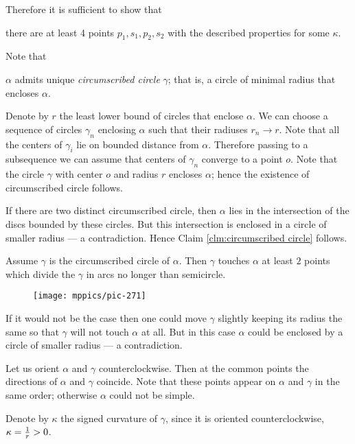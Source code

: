 Therefore it is sufficient to show that

\begin{clm}{}\label{clm-key}
there are at least 4 points $p_1,s_1,p_2,s_2$ with the described properties for some $\kappa$.
\end{clm}


Note that
\begin{clm}{}\label{clm:circumscribed circle}
$\alpha$
admits unique \emph{circumscribed circle} $\gamma$; that is, a circle of minimal radius that encloses $\alpha$.
\end{clm}

Denote by $r$ the least lower bound of circles that enclose $\alpha$.
We can choose a sequence of circles $\gamma_n$ enclosing $\alpha$ such that their radiuses $r_n\to r$.
Note that all the centers of $\gamma_i$ lie on bounded distance from $\alpha$.
Therefore passing to a subsequence we can assume that centers of $\gamma_n$ converge to a point $o$.
Note that the circle $\gamma$ with center $o$ and radius $r$ encloses $\alpha$;
hence the existence of circumscribed circle follows.

If there are two distinct circumscribed circle, then $\alpha$ lies in the intersection of the discs bounded by these circles.
But this intersection is enclosed in a circle of smaller radius --- a contradiction.
Hence Claim \ref{clm:circumscribed circle} follows.


\begin{clm}{}
Assume $\gamma$ is the circumscribed circle of $\alpha$.
Then $\gamma$ touches $\alpha$ at least $2$ points which divide the $\gamma$ in arcs no longer than semicircle.
\end{clm}

\begin{wrapfigure}{r}{38 mm}
\vskip-4mm
\centering
\texttt{[image: mppics/pic-271]}
\vskip0mm
\end{wrapfigure}


If it would not be the case then one could move $\gamma$ slightly keeping its radius the same so that $\gamma$ will not touch $\alpha$ at all.
But in this case $\alpha$ could be enclosed by a circle of smaller radius --- a contradiction.


Let us orient $\alpha$ and $\gamma$ counterclockwise.
Then at the common points the directions of $\alpha$ and $\gamma$ coincide.
Note that these points appear on $\alpha$ and $\gamma$ in the same order;
otherwise $\alpha$ could not be simple.

Denote by $\kappa$ the signed curvature of $\gamma$, since it is oriented counterclockwise,
$\kappa\z=\tfrac1r>0$.

